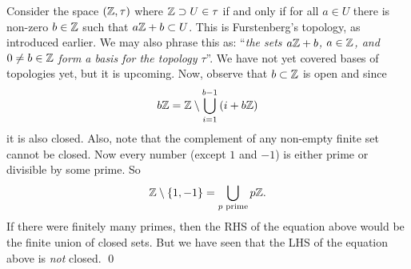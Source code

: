 
\begin{example}
	Consider the space $(\mathbb{Z}, \tau)$ where $\mathbb{Z} \supset U \in \tau$ if and only if
	for all $a \in U$ there is non-zero $b \in \mathbb{Z}$ such that 
	$a\mathbb{Z} + b \subset U$.
	This is Furstenberg's topology, as introduced earlier.
	We may also phrase this as: ``\emph{the sets $a\mathbb{Z} + b$, $a \in \mathbb{Z}$, and 
	$0 \neq b \in \mathbb{Z}$ form a basis for the topology $\tau$}''.
	We have not yet covered bases of topologies yet, but it is upcoming.
	Now, observe that $b \subset \mathbb{Z}$ is open and since
	\[
		b\mathbb{Z} = \mathbb{Z} \setminus \bigcup_{i=1}^{b-1} \left( i + b\mathbb{Z} \right)
	\]
	it is also closed.
	Also, note that the complement of any non-empty finite set cannot be closed.
	Now every number (except $1$ and $-1$) is either prime or divisible by some
	prime.
	So 
	\[
		\mathbb{Z} \setminus \left\{ 1, -1 \right\} = 
		\bigcup_{\text{$p$ prime}} p \mathbb{Z}.
	\]
	If there were finitely many primes, then the RHS of the equation above would
	be the finite union of closed sets.
	But we have seen that the LHS of the equation above is \emph{not} closed. 
	\qed
\end{example}
